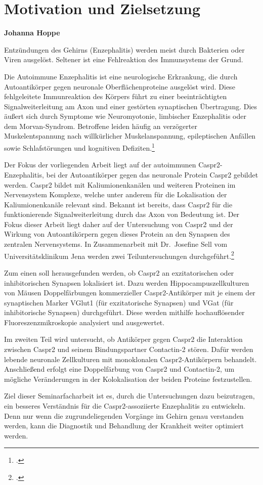 \chapter{Motivation und Zielsetzung}
\textbf{Johanna Hoppe}


Entzündungen des Gehirns (Enzephalitis) werden meist durch Bakterien
oder Viren ausgelöst. Seltener ist eine Fehlreaktion des Immunsystems
der Grund.

Die Autoimmune Enzephalitis ist eine neurologische Erkrankung, die durch
Autoantikörper gegen neuronale Oberflächenproteine ausgelöst wird. Diese
fehlgeleitete Immunreaktion des Körpers führt zu einer beeinträchtigten
Signalweiterleitung am Axon und einer gestörten synaptischen
Übertragung. Dies äußert sich durch Symptome wie Neuromyotonie,
limbischer Enzephalitis oder dem Morvan-Syndrom. Betroffene leiden häufig
an verzögerter Muskelentspannung nach willkürlicher Muskelanspannung,
epileptischen Anfällen sowie Schlafstörungen und kognitiven
Defiziten.\footcite{VanSonderenNatRev2016}

Der Fokus der vorliegenden Arbeit liegt auf der autoimmunen
Caspr2-Enzephalitis, bei der Autoantikörper gegen das neuronale Protein
Caspr2 gebildet werden. Caspr2 bildet mit Kaliumionenkanälen und
weiteren Proteinen im Nervensystem Komplexe, welche unter anderem für
die Lokalisation der Kaliumionenkanäle relevant sind. Bekannt ist
bereits, dass Caspr2 für die funktionierende Signalweiterleitung durch
das Axon von Bedeutung ist. Der Fokus dieser Arbeit liegt daher auf der
Untersuchung von Caspr2 und der Wirkung von Autoantikörpern gegen
dieses Protein an den Synapsen des zentralen Nervensystems. In
Zusammenarbeit mit Dr.~Josefine Sell vom Universitätsklinikum Jena
werden zwei Teiluntersuchungen
durchgeführt.\footcite{Mitrevski}

Zum einen soll herausgefunden werden, ob Caspr2 an exzitatorischen oder
inhibitorischen Synapsen lokalisiert ist. Dazu werden
Hippocampuszellkulturen von Mäusen Doppelfärbungen kommerzieller
Caspr2-Antikörper mit je einem der synaptischen Marker VGlut1 (für
exzitatorische Synapsen) und VGat (für inhibitorische Synapsen)
durchgeführt. Diese werden mithilfe hochauflösender
Fluoreszenzmikroskopie analysiert und ausgewertet.

Im zweiten Teil wird untersucht, ob Antikörper gegen Caspr2 die
Interaktion zwischen Caspr2 und seinem Bindungspartner Contactin-2
stören. Dafür werden lebende neuronale Zellkulturen mit monoklonalen
Caspr2-Antikörpern behandelt. Anschließend erfolgt eine Doppelfärbung
von Caspr2 und Contactin-2, um mögliche Veränderungen in der
Kolokalisation der beiden Proteine festzustellen.

Ziel dieser Seminarfacharbeit ist es, durch die Untersuchungen dazu
beizutragen, ein besseres Verständnis für die Caspr2-assoziierte
Enzephalitis zu entwickeln. Denn nur wenn die zugrundeliegenden Vorgänge
im Gehirn genau verstanden werden, kann die Diagnostik und Behandlung
der Krankheit weiter optimiert werden.